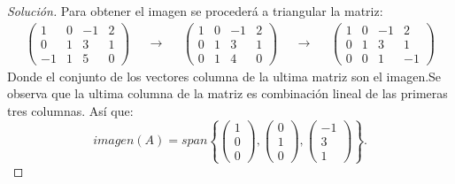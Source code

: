 \documentclass[12pt]{book}
\newenvironment{solucion}
  {\renewcommand\qedsymbol{$\square$}\begin{proof}[Solución]}
  {\end{proof}}
\begin{document}
\begin{solucion} Para obtener el imagen se procederá a triangular la matriz:
    \begin{align*}
        \begin{pmatrix}
            1 & 0 & -1 & 2\\
            0 & 1 & 3 & 1\\
            -1 & 1 & 5 & 0
        \end{pmatrix} & & \rightarrow & &\begin{pmatrix}
            1 & 0 & -1 & 2\\
            0 & 1 & 3 & 1\\
            0 & 1 & 4 & 0
        \end{pmatrix} & & \rightarrow & &\begin{pmatrix}
            1 & 0 & -1 & 2\\
            0 & 1 & 3 & 1\\
            0 & 0 & 1 & -1
            \end{pmatrix}
    \end{align*}
    Donde el conjunto de los vectores columna de la ultima matriz son el imagen.Se observa que la ultima columna de la matriz es combinación lineal de las primeras tres columnas. Así que:
        \[
        imagen(A)=span\left\{\begin{pmatrix}
            1\\
            0\\
            0
        \end{pmatrix}, \begin{pmatrix}
            0\\
            1\\
            0
        \end{pmatrix}, \begin{pmatrix}
            -1\\
            3\\
            1
        \end{pmatrix}\right\}.
        \]
    

\end{solucion}
\end{document}

